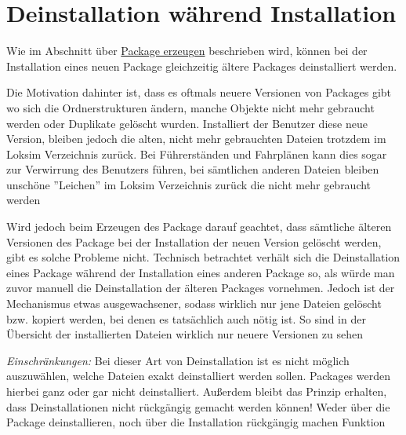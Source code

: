 \section{Deinstallation während Installation}

Wie im Abschnitt über \hyperref[sec:editor.allg.packages]{Package
erzeugen} beschrieben wird, können bei der Installation eines neuen
Package gleichzeitig ältere Packages deinstalliert werden.

Die Motivation dahinter ist, dass es oftmals neuere Versionen von
Packages gibt wo sich die Ordnerstrukturen ändern, manche Objekte nicht
mehr gebraucht werden oder Duplikate gelöscht wurden. Installiert der
Benutzer diese neue Version, bleiben jedoch die alten, nicht mehr
gebrauchten Dateien trotzdem im Loksim Verzeichnis zurück. Bei
Führerständen und Fahrplänen kann dies sogar zur Verwirrung des
Benutzers führen, bei sämtlichen anderen Dateien bleiben unschöne
''Leichen'' im Loksim Verzeichnis zurück die nicht mehr gebraucht werden

Wird jedoch beim Erzeugen des Package darauf geachtet, dass sämtliche
älteren Versionen des Package bei der Installation der neuen Version
gelöscht werden, gibt es solche Probleme nicht. Technisch betrachtet
verhält sich die Deinstallation eines Package während der Installation
eines anderen Package so, als würde man zuvor manuell die Deinstallation
der älteren Packages vornehmen. Jedoch ist der Mechanismus etwas
ausgewachsener, sodass wirklich nur jene Dateien gelöscht bzw. kopiert
werden, bei denen es tatsächlich auch nötig ist. So sind in der
Übersicht der installierten Dateien wirklich nur neuere Versionen zu
sehen

\emph{Einschränkungen:} Bei dieser Art von Deinstallation ist es nicht
möglich auszuwählen, welche Dateien exakt deinstalliert werden sollen.
Packages werden hierbei ganz oder gar nicht deinstalliert. Außerdem
bleibt das Prinzip erhalten, dass Deinstallationen nicht rückgängig
gemacht werden können! Weder über die Package deinstallieren, noch über
die Installation rückgängig machen Funktion
